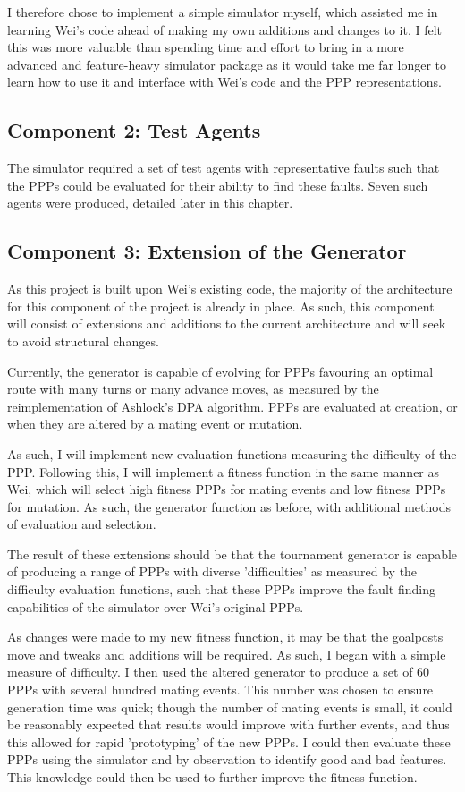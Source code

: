 \documentclass[authoryearcitations]{UoYCSproject}
\begin{document}
I therefore chose to implement a simple simulator myself, which assisted me in learning Wei's code ahead of making my own additions and changes to it. I felt this was more valuable than spending time and effort to bring in a more advanced and feature-heavy simulator package as it would take me far longer to learn how to use it and interface with Wei's code and the PPP representations.

\subsection{Component 2: Test Agents}
\label{sec:da_3_2}

The simulator required a set of test agents with representative faults such that the PPPs could be evaluated for their ability to find these faults. Seven such agents were produced, detailed later in this chapter.

\subsection{Component 3: Extension of the Generator}
\label{sec:da_3_3}
As this project is built upon Wei's existing code, the majority of the architecture for this component of the project is already in place. As such, this component will consist of extensions and additions to the current architecture and will seek to avoid structural changes.

Currently, the generator is capable of evolving for PPPs favouring an optimal route with many turns or many advance moves, as measured by the reimplementation of Ashlock's DPA algorithm. PPPs are evaluated at creation, or when they are altered by a mating event or mutation.

As such, I will implement new evaluation functions measuring the difficulty of the PPP. Following this, I will implement a fitness function in the same manner as Wei, which will select high fitness PPPs for mating events and low fitness PPPs for mutation. As such, the generator function as before, with additional methods of evaluation and selection.

The result of these extensions should be that the tournament  generator is capable of producing a range of PPPs with diverse 'difficulties' as measured by the difficulty evaluation functions, such that these PPPs improve the fault finding capabilities of the simulator over Wei's original PPPs.

As changes were made to my new fitness function, it may be that the goalposts move and tweaks and additions will be required. As such, I began with a simple measure of difficulty. I then used the altered generator to produce a set of 60 PPPs with several hundred mating events. This number was chosen to ensure generation time was quick; though the number of mating events is small, it could be reasonably expected that results would improve with further events, and thus this allowed for rapid 'prototyping' of the new PPPs. I could then evaluate these PPPs using the simulator and by observation to identify good and bad features. This knowledge could then be used to further improve the fitness function.
\end{document}
